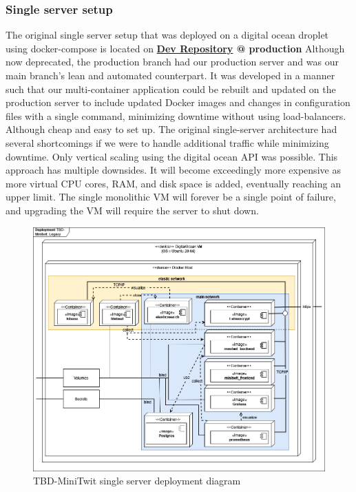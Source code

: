 \subsubsection{Single server setup}
\label{subsubsec:scalingProd}
The original single server setup that was deployed on a digital ocean droplet using docker-compose is located on \textbf{\hyperref[app:devRepo]{Dev Repository} @ production}
Although now deprecated, the production branch had our production server and was our main branch's lean and automated counterpart. It was developed in a manner such that our multi-container application could be rebuilt and updated on the production server to include updated Docker images and changes in configuration files with a single command, minimizing downtime without using load-balancers.\\
Although cheap and easy to set up. The original single-server architecture had several shortcomings if we were to handle additional traffic while minimizing downtime.
Only vertical scaling using the digital ocean API was possible. This approach has multiple downsides. It will become exceedingly more expensive as more virtual CPU cores, RAM, and disk space is added, eventually reaching an upper limit. The single monolithic VM will forever be a single point of failure, and upgrading the VM will require the server to shut down.
\begin {figure}[H]
    \centering
    \includegraphics[scale=0.49]{images/DevopsDiagrams-Legacy deploy mini.drawio.png}
    \caption{TBD-MiniTwit single server deployment diagram}
    \label{fig:legacyDeploy}
\end{figure}

